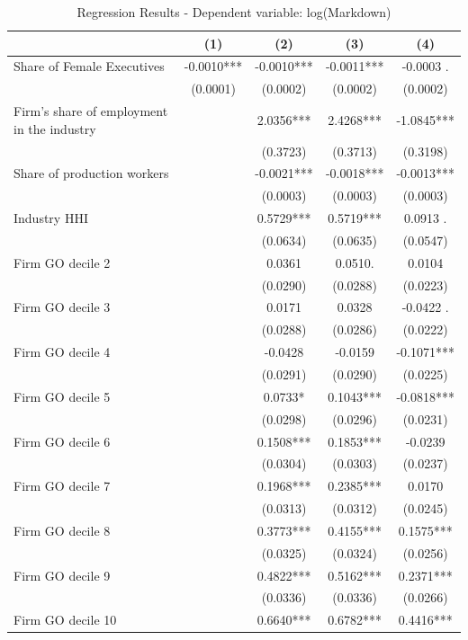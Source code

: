 \documentclass[12pt]{article}
\begin{document}
\begin{table}[H]
\centering
\footnotesize
\caption{Regression Results - Dependent variable: log(Markdown)}
\label{tab:regression}
\begin{tabular}{lcccc}
\hline\hline
 & (1) & (2) & (3) & (4) \\
\hline
Share of Female Executives & -0.0010*** & -0.0010*** & -0.0011*** & -0.0003 . \\
 & (0.0001) & (0.0002) & (0.0002) & (0.0002) \\
Firm's share of employment in the industry &  & 2.0356*** & 2.4268*** & -1.0845*** \\
 &  & (0.3723) & (0.3713) & (0.3198) \\
Share of production workers &  & -0.0021*** & -0.0018*** & -0.0013*** \\
 &  & (0.0003) & (0.0003) & (0.0003) \\
Industry HHI &  & 0.5729*** & 0.5719*** & 0.0913 . \\
 &  & (0.0634) & (0.0635) & (0.0547) \\
Firm GO decile 2 &  & 0.0361 & 0.0510. & 0.0104 \\
 &  & (0.0290) & (0.0288) & (0.0223) \\
Firm GO decile 3 &  & 0.0171 & 0.0328 & -0.0422 . \\
 &  & (0.0288) & (0.0286) & (0.0222) \\
Firm GO decile 4 &  & -0.0428 & -0.0159 & -0.1071*** \\
 &  & (0.0291) & (0.0290) & (0.0225) \\
Firm GO decile 5 &  & 0.0733* & 0.1043*** & -0.0818*** \\
 &  & (0.0298) & (0.0296) & (0.0231) \\
Firm GO decile 6 &  & 0.1508*** & 0.1853*** & -0.0239 \\
 &  & (0.0304) & (0.0303) & (0.0237) \\
Firm GO decile 7 &  & 0.1968*** & 0.2385*** & 0.0170 \\
 &  & (0.0313) & (0.0312) & (0.0245) \\
Firm GO decile 8 &  & 0.3773*** & 0.4155*** & 0.1575*** \\
 &  & (0.0325) & (0.0324) & (0.0256) \\
Firm GO decile 9  &  & 0.4822*** & 0.5162*** & 0.2371*** \\
 &  & (0.0336) & (0.0336) & (0.0266) \\
Firm GO decile 10 &  & 0.6640*** & 0.6782*** & 0.4416*** \\

\end{tabular}
\end{table}
\end{document}
